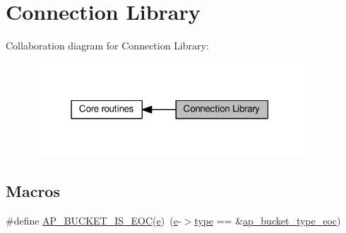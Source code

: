 \hypertarget{group__APACHE__CORE__CONNECTION}{}\section{Connection Library}
\label{group__APACHE__CORE__CONNECTION}
Collaboration diagram for Connection Library\+:
\nopagebreak
\begin{figure}[H]
\begin{center}
\leavevmode
\includegraphics[width=289pt]{group__APACHE__CORE__CONNECTION}
\end{center}
\end{figure}
\subsection*{Macros}
\begin{DoxyCompactItemize}
\item 
\#define \hyperlink{group__APACHE__CORE__CONNECTION_ga6ae3ca117a7265de04b91849d6b5acb1}{A\+P\+\_\+\+B\+U\+C\+K\+E\+T\+\_\+\+I\+S\+\_\+\+E\+OC}(\hyperlink{pcregrep_8txt_acd90314acb2c2e5cd19681136c08efac}{e})~(\hyperlink{pcregrep_8txt_acd90314acb2c2e5cd19681136c08efac}{e}-\/$>$\hyperlink{pcre_8txt_a2463fbbe8b0c90b90db12195e1edaa5d}{type} == \&\hyperlink{eoc__bucket_8c_abacd68acbfc383678e17e9f78af31856}{ap\+\_\+bucket\+\_\+type\+\_\+eoc})
\end{DoxyCompactItemize}
